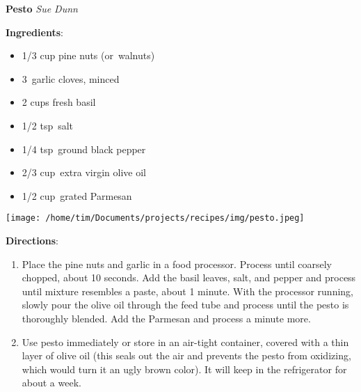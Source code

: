 \documentclass[11pt, twoside, openany]{book}
\begin{document}
\noindent\begin{minipage}[t]{\linewidth}%
{\Large\textbf{Pesto}} \label{pesto}\hfill\textit{Sue Dunn}\\
\noindent\begin{minipage}[t]{0.78\linewidth}%
\textbf{Ingredients}:\vspace{-3mm}
\begin{multicols}{2}
\begin{itemize}\setlength\itemsep{-1mm}
\item 1/3 cup pine nuts (or walnuts)
\item 3 garlic cloves, minced
\item 2 cups fresh basil
\item 1/2 tsp salt
\item 1/4 tsp ground black pepper
\item 2/3 cup extra virgin olive oil
\item 1/2 cup grated Parmesan
\end{itemize}
\end{multicols}
\end{minipage}
\noindent\begin{minipage}[t]{0.18\linewidth}
\centering \strut\vspace*{-\baselineskip}\newline
\texttt{[image: /home/tim/Documents/projects/recipes/img/pesto.jpeg]}\\
\end{minipage}\vspace{3mm}
\textbf{Directions}:
\vspace{-3mm}\begin{enumerate}\setlength\itemsep{-1mm}
\item Place the pine nuts and garlic in a food processor. Process until coarsely chopped, about 10 seconds. Add the basil leaves, salt, and pepper and process until mixture resembles a paste, about 1 minute. With the processor running, slowly pour the olive oil through the feed tube and process until the pesto is thoroughly blended. Add the Parmesan and process a minute more.
\item Use pesto immediately or store in an air-tight container, covered with a thin layer of olive oil (this seals out the air and prevents the pesto from oxidizing, which would turn it an ugly brown color). It will keep in the refrigerator for about a week.
\end{enumerate}
\end{minipage}\vspace{8mm}
\end{document}
